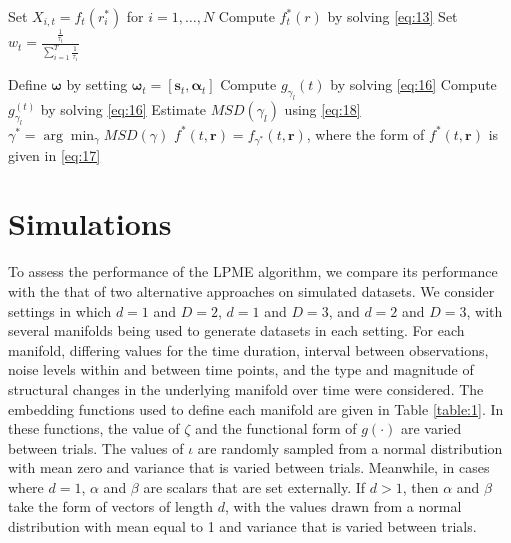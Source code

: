 \documentclass[11pt,reqno]{article}
\theoremstyle{definition}
\begin{document}
\begin{algorithm}
 {
  Set $X_{i, t} = f_t(r_{i}^*)$ for $i = 1, \dots, N$\;
  Compute $f_t^*(r)$ by solving \eqref{eq:13}\;
  Set $w_t = \frac{\frac{1}{\tau_t}}{\sum_{i=1}^{T}\frac{1}{\tau_i}}$\;
}

  Define $\boldsymbol{\omega}$ by setting $\boldsymbol{\omega}_t = \left[\boldsymbol{s}_t, \boldsymbol{\alpha}_t\right]$\;
   {
    Compute $g_{\gamma_l}(t)$ by solving \eqref{eq:16}\;
     {
      Compute $g_{\gamma_l}^{(t)}$ by solving \eqref{eq:16}\;
    }
    Estimate $MSD(\gamma_l)$ using \eqref{eq:18}\;
  }
  $\gamma^* = \arg\min_{\gamma}MSD(\gamma)$\;
  $f^*(t, \boldsymbol{r}) = f_{\gamma^*}(t, \boldsymbol{r})$, where the form of $f^*(t, \boldsymbol{r})$ is given in \eqref{eq:17}
\end{algorithm}

\section{Simulations}

To assess the performance of the LPME algorithm, we compare its performance with the that of two alternative approaches on simulated datasets. We consider settings in which $d = 1$ and $D = 2$, $d = 1$ and $D = 3$, and $d = 2$ and $D = 3$, with several manifolds being used to generate datasets in each setting. For each manifold, differing values for the time duration, interval between observations, noise levels within and between time points, and the type and magnitude of structural changes in the underlying manifold over time were considered. The embedding functions used to define each manifold are given in Table \ref{table:1}. In these functions, the value of $\zeta$ and the functional form of $g(\cdot)$ are varied between trials. The values of $\iota$ are randomly sampled from a normal distribution with mean zero and variance that is varied between trials. Meanwhile, in cases where $d=1$, $\alpha$ and $\beta$ are scalars that are set externally. If $d>1$, then $\alpha$ and $\beta$ take the form of vectors of length $d$, with the values drawn from a normal distribution with mean equal to 1 and variance that is varied between trials.
\end{document}
